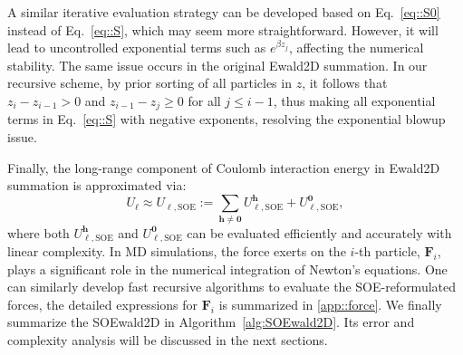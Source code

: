 \begin{rmk}
	A similar iterative evaluation strategy can be developed based on Eq.~\eqref{eq::S0} instead of Eq.~\eqref{eq::S}, which may seem more straightforward.
	However, it will lead to uncontrolled exponential terms such as $e^{\beta z_{j}}$, affecting the numerical stability.
	The same issue occurs in the original Ewald2D summation.
	In our recursive scheme, by prior sorting of all particles in $z$, it follows that  $z_{i}-z_{i-1} > 0$ and $z_{i-1} - z_{j} \geq 0$ for all $j \leq i - 1$, thus making all exponential terms in Eq.~\eqref{eq::S} with negative exponents, resolving the exponential blowup issue.
	\label{rmk::stable}
\end{rmk}



Finally, the long-range component of Coulomb interaction energy in Ewald2D summation is approximated via:
\begin{equation}\label{eq:U_l_SOE}
	U_{\ell}\approx U_{\ell,\text{SOE}} := \sum_{\bm{h}\neq \bm{0}} U_{\ell,\text{SOE}}^{\bm{h}}+U_{\ell,\text{SOE}}^{\bm{0}},
\end{equation}
where both $U_{\ell,\text{SOE}}^{\bm{h}}$ and $U_{\ell,\text{SOE}}^{\bm{0}}$ can be evaluated efficiently and accurately with linear complexity.
In MD simulations, the force exerts on the $i$-th particle, $\bm{F}_{i}$, plays a significant role in the numerical integration of Newton's equations.
One can similarly develop fast recursive algorithms to evaluate the SOE-reformulated forces,
the detailed expressions for $\bm{F}_{i}$ is summarized in \ref{app::force}.
We finally summarize the SOEwald2D  in Algorithm~\ref{alg:SOEwald2D}. Its error and complexity analysis will be discussed in the next sections.

